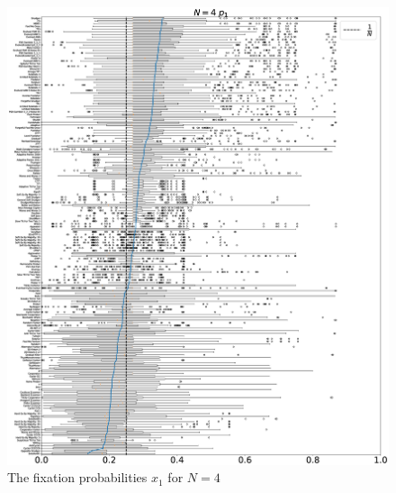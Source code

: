 \documentclass[10pt,letterpaper]{article}
\begin{document}
\begin{figure}[!hbtp]
    \centering
    \includegraphics[draft, width=\textwidth]{./Fig14.eps}
    \caption{The fixation probabilities \(x_1\) for \(N=4\)}
\end{figure}
\end{document}
